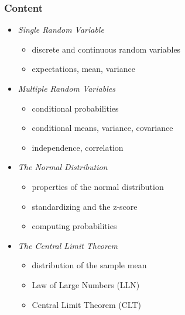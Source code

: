 

\begin{frame}
\frametitle{Content} 
\begin{itemize}
\item \emph{Single Random Variable}
\begin{itemize}
\item discrete and continuous random variables
\item expectations, mean, variance
\end{itemize}
\item \emph{Multiple Random Variables}
\begin{itemize}
\item conditional probabilities
\item conditional means, variance, covariance
\item independence, correlation
\end{itemize}
\item \emph{The Normal Distribution}
\begin{itemize}
\item properties of the normal distribution
\item standardizing and the z-score
\item computing probabilities
\end{itemize}
\item \emph{The Central Limit Theorem}
\begin{itemize}
\item distribution of the sample mean
\item Law of Large Numbers (LLN)
\item Central Limit Theorem (CLT)
\end{itemize}
\end{itemize}
\end{frame}
